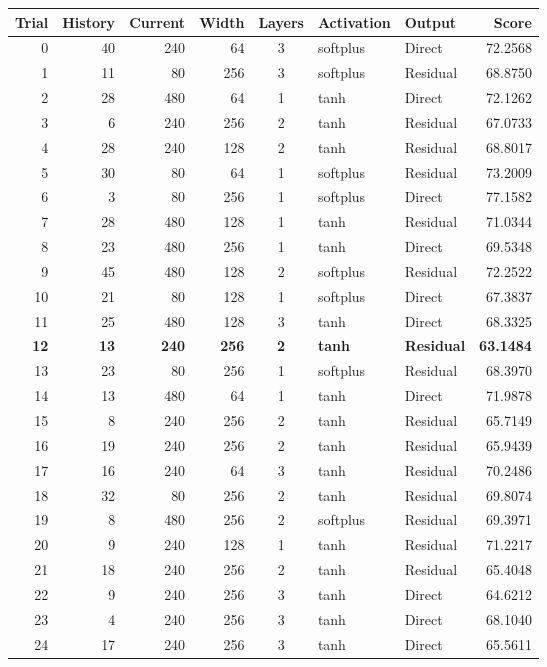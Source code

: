 \begin{tabular}{@{}rrrrcllr@{}}
\toprule
Trial & History & Current & Width & Layers & Activation & Output & Score \\
\midrule
0 & 40 & 240 & 64 & 3 & softplus & Direct & 72.2568 \\
1 & 11 & 80 & 256 & 3 & softplus & Residual & 68.8750 \\
2 & 28 & 480 & 64 & 1 & tanh & Direct & 72.1262 \\
3 & 6 & 240 & 256 & 2 & tanh & Residual & 67.0733 \\
4 & 28 & 240 & 128 & 2 & tanh & Residual & 68.8017 \\
5 & 30 & 80 & 64 & 1 & softplus & Residual & 73.2009 \\
6 & 3 & 80 & 256 & 1 & softplus & Direct & 77.1582 \\
7 & 28 & 480 & 128 & 1 & tanh & Residual & 71.0344 \\
8 & 23 & 480 & 256 & 1 & tanh & Direct & 69.5348 \\
9 & 45 & 480 & 128 & 2 & softplus & Residual & 72.2522 \\
10 & 21 & 80 & 128 & 1 & softplus & Direct & 67.3837 \\
11 & 25 & 480 & 128 & 3 & tanh & Direct & 68.3325 \\
\textbf{12} & \textbf{13} & \textbf{240} & \textbf{256} & \textbf{2} & \textbf{tanh} & \textbf{Residual} & \textbf{63.1484} \\
13 & 23 & 80 & 256 & 1 & softplus & Residual & 68.3970 \\
14 & 13 & 480 & 64 & 1 & tanh & Direct & 71.9878 \\
15 & 8 & 240 & 256 & 2 & tanh & Residual & 65.7149 \\
16 & 19 & 240 & 256 & 2 & tanh & Residual & 65.9439 \\
17 & 16 & 240 & 64 & 3 & tanh & Residual & 70.2486 \\
18 & 32 & 80 & 256 & 2 & tanh & Residual & 69.8074 \\
19 & 8 & 480 & 256 & 2 & softplus & Residual & 69.3971 \\
20 & 9 & 240 & 128 & 1 & tanh & Residual & 71.2217 \\
21 & 18 & 240 & 256 & 2 & tanh & Residual & 65.4048 \\
22 & 9 & 240 & 256 & 3 & tanh & Direct & 64.6212 \\
23 & 4 & 240 & 256 & 3 & tanh & Direct & 68.1040 \\
24 & 17 & 240 & 256 & 3 & tanh & Direct & 65.5611 \\
\bottomrule
\end{tabular}
